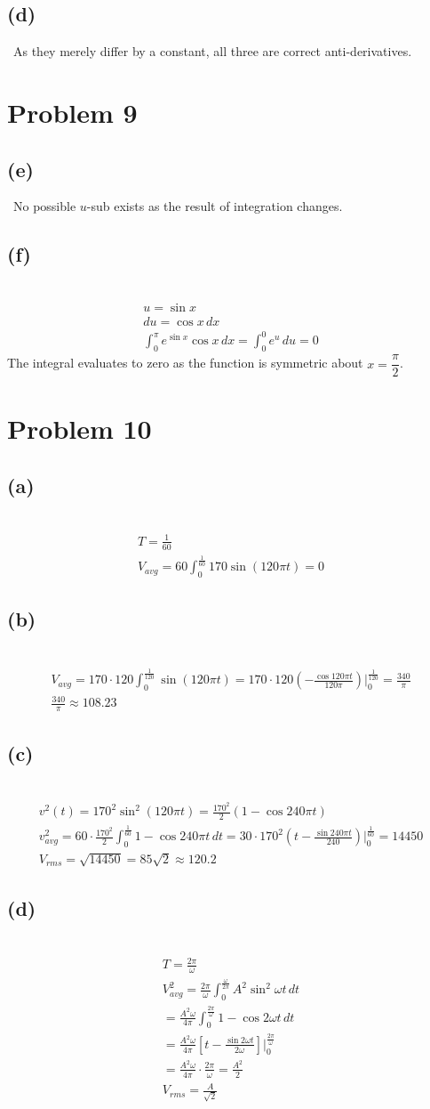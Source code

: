\documentclass[12pt]{article}
\newcommand{\vem}{\vspace{0.5em}}
\newcommand{\problem}[1]{\section{Problem #1}}
\newcommand{\subproblem}[1]{\subsection{(#1)} \,}
\begin{document}
\subproblem{d}
As they merely differ by a constant, all three are correct anti-derivatives.

\problem{9}

\subproblem{e}
No possible $u$-sub exists as the result of integration changes.\vem

\subproblem{f}
\begin{gather*}
    u=\sin x\\
    du=\cos x\, dx\\
    \int_0^\pi e^{\sin x}\cos x\, dx =\int_0^0e^u\, du=0
\end{gather*}
The integral evaluates to zero as the function is symmetric about $x=\dfrac{\pi}{2}$.

\problem{10}

\subproblem{a}
\begin{gather*}
    T=\frac{1}{60}\\
    V_{avg} = 60\int_0^{\frac{1}{60}}170\sin (120\pi t)=0 
\end{gather*}

\subproblem{b}
\begin{gather*}
    V_{avg} = 170\cdot 120\int_0^{\frac{1}{120}}\sin (120\pi t)=170\cdot 120(-\frac{\cos 120\pi t}{120\pi})\Big|^{\frac{1}{120}}_0=\boxed{\frac{340}{\pi}}\\
    \frac{340}{\pi} \approx \boxed{108.23}
\end{gather*}

\subproblem{c}
\begin{gather*}
    v^2(t)=170^2\sin ^2(120\pi t)=\frac{170^2}{2}(1-\cos 240\pi t)\\
    v^2_{avg}=60\cdot \frac{170^2}{2}\int_0^\frac{1}{60} 1-\cos 240\pi t \, dt=30\cdot 170^2(t-\frac{\sin 240\pi t}{240})\Big|_0^\frac{1}{60}=14450\\
    V_{rms}=\sqrt{14450}=\boxed{85\sqrt{2}\approx 120.2}
\end{gather*}

\subproblem{d}
\begin{gather*}
    T=\frac{2\pi}{\omega }\\
    V^2_{avg}=\frac{2\pi}{\omega} \int_0^\frac{\omega}{2\pi } A^2\sin ^2\omega t\, dt\\
    =\frac{A^2\omega}{4\pi }\int_0^\frac{2\pi}{\omega } 1-\cos 2\omega t\, dt\\
    =\frac{A^2\omega}{4\pi } [t-\frac{\sin 2\omega t}{2\omega }]\Big|^\frac{2\pi}{\omega}_0\\
    =\frac{A^2\omega}{4\pi } \cdot \frac{2\pi}{\omega}= \frac{A^2}{2}\\
    \boxed{V_{rms}=\frac{A}{\sqrt{2}}}
\end{gather*}
\end{document}
